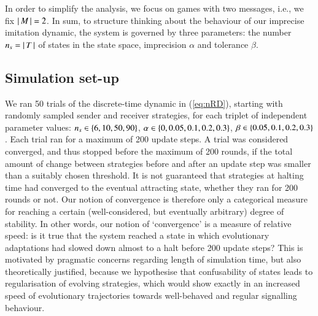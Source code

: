 \documentclass[12pt,english]{article}
\newcommand{\imprecision}{\ensuremath{\alpha}} %
\newcommand{\toler}{\ensuremath{\beta}} %
\newcommand{\ns}{\ensuremath{n_s}} %
\numberwithin{equation}{section}
\begin{document}
In order to simplify the analysis, we focus on games with two messages, i.e., we fix $\left \lvert \, M \, \right\rvert = 2$.
In sum, to structure thinking about the behaviour of our imprecise imitation dynamic, the system
is governed by three parameters: the number $\ns = \card{T}$ of states in the state space,
imprecision $\imprecision$ and tolerance $\toler$.


\subsection{Simulation set-up}
\label{sec:simulations}

We ran 50 trials of the discrete-time dynamic in (\ref{eq:nRD}), starting with randomly sampled
sender and receiver strategies, for each triplet of independent parameter values:
$\ns \in \set{6, 10, 50, 90}$, $\imprecision \in \set{0, 0.05, 0.1, 0.2, 0.3}$,
$\toler \in \set{0.05, 0.1, 0.2, 0.3}$. Each trial ran for a maximum of 200 update steps. A
trial was considered converged, and thus stopped before the maximum of 200 rounds, if the total
amount of change between strategies before and after an update step was smaller than a suitably
chosen threshold. It is not guaranteed that strategies at halting time had converged to the
eventual attracting state, whether they ran for 200 rounds or not. Our notion of convergence is
therefore only a categorical measure for reaching a certain (well-considered, but eventually
arbitrary) degree of stability. In other words, our notion of `convergence' is a measure of
relative speed: is it true that the system reached a state in which evolutionary adaptations
had slowed down almost to a halt before 200 update steps? This is motivated by pragmatic
concerns regarding length of simulation time, but also theoretically justified, because we
hypothesise that confusability of states leads to regularisation of evolving strategies, which
would show exactly in an increased speed of evolutionary trajectories towards well-behaved and
regular signalling behaviour.
\end{document}
